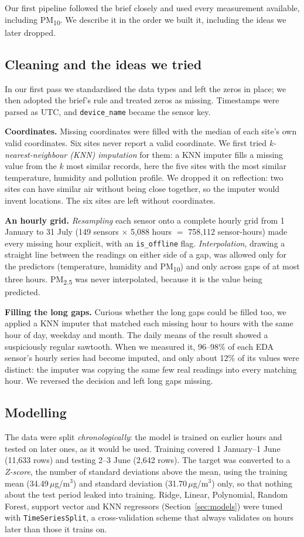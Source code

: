 \documentclass{ieeeaccess}
\newcommand{\ugm}{\,$\mu$g/m$^{3}$}
\newcommand{\pmtwo}{PM\textsubscript{2.5}}
\newcommand{\pmten}{PM\textsubscript{10}}
\begin{document}
Our first pipeline followed the brief closely and used every measurement available, including \pmten{}. We describe it in the order we built it, including the ideas we later dropped.

\subsection{Cleaning and the ideas we tried}
In our first pass we standardised the data types and left the zeros in place; we then adopted the brief's rule and treated zeros as missing. Timestamps were parsed as UTC, and \texttt{device\_name} became the sensor key.

\textbf{Coordinates.} Missing coordinates were filled with the median of each site's own valid coordinates. Six sites never report a valid coordinate. We first tried \emph{k-nearest-neighbour (KNN) imputation} for them: a KNN imputer fills a missing value from the $k$ most similar records, here the five sites with the most similar temperature, humidity and pollution profile. We dropped it on reflection: two sites can have similar air without being close together, so the imputer would invent locations. The six sites are left without coordinates.

\textbf{An hourly grid.} \emph{Resampling} each sensor onto a complete hourly grid from 1 January to 31 July (149 sensors $\times$ 5{,}088 hours $=$ 758{,}112 sensor-hours) made every missing hour explicit, with an \texttt{is\_offline} flag. \emph{Interpolation}, drawing a straight line between the readings on either side of a gap, was allowed only for the predictors (temperature, humidity and \pmten{}) and only across gaps of at most three hours. \pmtwo{} was never interpolated, because it is the value being predicted.

\textbf{Filling the long gaps.} Curious whether the long gaps could be filled too, we applied a KNN imputer that matched each missing hour to hours with the same hour of day, weekday and month. The daily means of the result showed a suspiciously regular sawtooth. When we measured it, 96--98\% of each EDA sensor's hourly series had become imputed, and only about 12\% of its values were distinct: the imputer was copying the same few real readings into every matching hour. We reversed the decision and left long gaps missing.

\subsection{Modelling}
The data were split \emph{chronologically}: the model is trained on earlier hours and tested on later ones, as it would be used. Training covered 1 January--1 June (11{,}633 rows) and testing 2--3 June (2{,}642 rows). The target was converted to a \emph{Z-score}, the number of standard deviations above the mean, using the training mean (34.49\ugm) and standard deviation (31.70\ugm) only, so that nothing about the test period leaked into training. Ridge, Linear, Polynomial, Random Forest, support vector and KNN regressors (Section~\ref{sec:models}) were tuned with \texttt{TimeSeriesSplit}, a cross-validation scheme that always validates on hours later than those it trains on.
\end{document}
